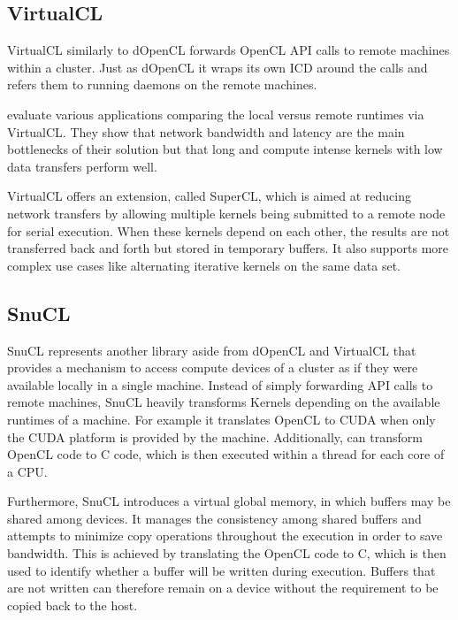 \subsection*{VirtualCL}

VirtualCL similarly to dOpenCL forwards OpenCL API calls to remote machines within a cluster\cite{virtualcl}. Just as dOpenCL it wraps its own ICD around the calls and refers them to running daemons on the remote machines.

\citeauthor{virtualcl} evaluate various applications comparing the local versus remote runtimes via VirtualCL. They show that network bandwidth and latency are the main bottlenecks of their solution but that long and compute intense kernels with low data transfers perform well.

VirtualCL offers an extension, called SuperCL, which is aimed at reducing network transfers by allowing multiple kernels being submitted to a remote node for serial execution. When these kernels depend on each other, the results are not transferred back and forth but stored in temporary buffers. It also supports more complex use cases like alternating iterative kernels on the same data set.

\subsection*{SnuCL}

SnuCL represents another library aside from dOpenCL and VirtualCL that provides a mechanism to access compute devices of a cluster as if they were available locally in a single machine\cite{snucl}. Instead of simply forwarding API calls to remote machines, SnuCL heavily transforms Kernels depending on the available runtimes of a machine. For example it translates OpenCL to CUDA when only the CUDA platform is provided by the machine. Additionally, can transform OpenCL code to C code, which is then executed within a thread for each core of a CPU.

Furthermore, SnuCL introduces a virtual global memory, in which buffers may be shared among devices. It manages the consistency among shared buffers and attempts to minimize copy operations throughout the execution in order to save bandwidth. This is achieved by translating the OpenCL code to C, which is then used to identify whether a buffer will be written during execution. Buffers that are not written can therefore remain on a device without the requirement to be copied back to the host.

